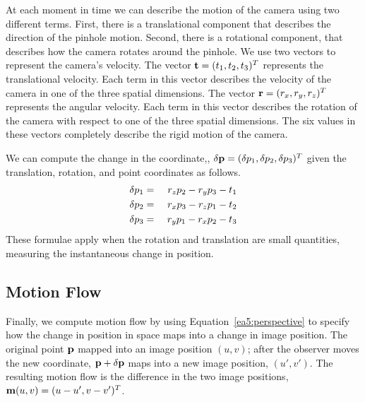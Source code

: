 At each moment in time we can describe the motion of the camera using
two different terms.  First, there is a translational component that
describes the direction of the pinhole motion.  Second, there is a
rotational component, that describes how the camera rotates around the
pinhole.  We use two vectors to represent the camera's velocity.  The
vector $\mbox{${\bf t}$} =(\mbox{${t}_{1}$}, \mbox{${t}_{2}$},\mbox{${t}_{3}$} )^T$
represents the translational velocity.  Each term in this vector
describes the velocity of the camera in one of the three spatial
dimensions.  The vector $\mbox{${\bf r}$} = (\mbox{${r}_{x}$}
,\mbox{${r}_{y}$},\mbox{${r}_{z}$})^T$ represents the angular velocity.  Each
term in this vector describes the rotation of the camera with respect
to one of the three spatial dimensions. The six values in these
vectors completely describe the rigid motion of the camera.

We can compute the change in the coordinate,, ${\bf \delta} \mbox{${\bf p}$} =
(\delta \mbox{${p}_{1}$}, \delta \mbox{${p}_{2}$}, \delta \mbox{${p}_{3}$})^T$
given the translation, rotation, and point coordinates as follows.
\begin{eqnarray*}
\delta \mbox{${p}_{1}$} & = & 
 \mbox{${r}_{z}$} \mbox{${p}_{2}$} - \mbox{${r}_{y}$} \mbox{${p}_{3}$} - \mbox{${t}_{1}$} \\
\delta \mbox{${p}_{2}$} & = & \
 \mbox{${r}_{x}$} \mbox{${p}_{3}$} - \mbox{${r}_{z}$} \mbox{${p}_{1}$} - \mbox{${t}_{2}$} \\
\delta \mbox{${p}_{3}$} & = & 
 \mbox{${r}_{y}$} \mbox{${p}_{1}$} - \mbox{${r}_{x}$} \mbox{${p}_{2}$} - \mbox{${t}_{3}$}
\end{eqnarray*}
These formulae apply when the rotation and translation are small
quantities, measuring the instantaneous change in position.

\subsection*{Motion Flow}
Finally, we compute motion flow by using
Equation~\ref{ea5:perspective} to specify how the change in position
in space maps into a change in image position.  The original point
$\mbox{${\bf p}$}$ mapped into an image position $(u,v)$; after the observer
moves the new coordinate, $\mbox{${\bf p}$} + {\bf \delta} \mbox{${\bf p}$}$ maps into
a new image position, $(u',v')$.  The resulting motion flow is the
difference in the two image positions, $\mbox{${\bf m}(u,v)$} =
(u-u',v-v')^T$.

